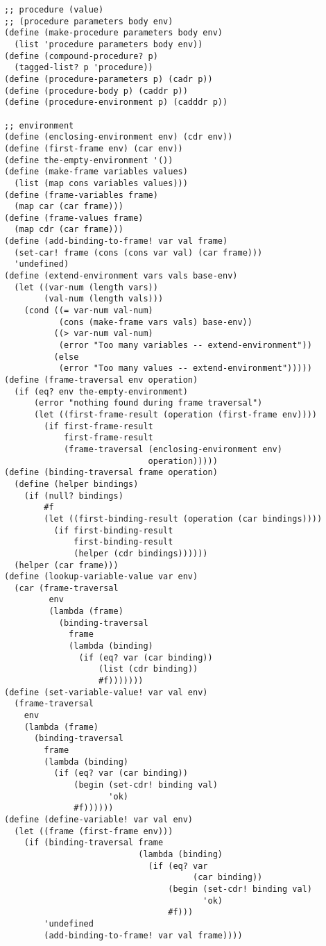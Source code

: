 \documentclass[../main.tex]{subfiles}
\begin{document}
\begin{lstlisting}
;; procedure (value)
;; (procedure parameters body env)
(define (make-procedure parameters body env)
  (list 'procedure parameters body env))
(define (compound-procedure? p)
  (tagged-list? p 'procedure))
(define (procedure-parameters p) (cadr p))
(define (procedure-body p) (caddr p))
(define (procedure-environment p) (cadddr p))

;; environment
(define (enclosing-environment env) (cdr env))
(define (first-frame env) (car env))
(define the-empty-environment '())
(define (make-frame variables values)
  (list (map cons variables values)))
(define (frame-variables frame)
  (map car (car frame)))
(define (frame-values frame)
  (map cdr (car frame)))
(define (add-binding-to-frame! var val frame)
  (set-car! frame (cons (cons var val) (car frame)))
  'undefined)
(define (extend-environment vars vals base-env)
  (let ((var-num (length vars))
        (val-num (length vals)))
    (cond ((= var-num val-num)
           (cons (make-frame vars vals) base-env))
          ((> var-num val-num)
           (error "Too many variables -- extend-environment"))
          (else
           (error "Too many values -- extend-environment")))))
(define (frame-traversal env operation)
  (if (eq? env the-empty-environment)
      (error "nothing found during frame traversal")
      (let ((first-frame-result (operation (first-frame env))))
        (if first-frame-result
            first-frame-result
            (frame-traversal (enclosing-environment env)
                             operation)))))
(define (binding-traversal frame operation)
  (define (helper bindings)
    (if (null? bindings)
        #f
        (let ((first-binding-result (operation (car bindings))))
          (if first-binding-result
              first-binding-result
              (helper (cdr bindings))))))
  (helper (car frame)))
(define (lookup-variable-value var env)
  (car (frame-traversal
         env
         (lambda (frame)
           (binding-traversal
             frame
             (lambda (binding)
               (if (eq? var (car binding))
                   (list (cdr binding))
                   #f)))))))
(define (set-variable-value! var val env)
  (frame-traversal
    env
    (lambda (frame)
      (binding-traversal
        frame
        (lambda (binding)
          (if (eq? var (car binding))
              (begin (set-cdr! binding val)
                     'ok)
              #f))))))
(define (define-variable! var val env)
  (let ((frame (first-frame env)))
    (if (binding-traversal frame
                           (lambda (binding)
                             (if (eq? var
                                      (car binding))
                                 (begin (set-cdr! binding val)
                                        'ok)
                                 #f)))
        'undefined
        (add-binding-to-frame! var val frame))))


\end{lstlisting}
\end{document}
